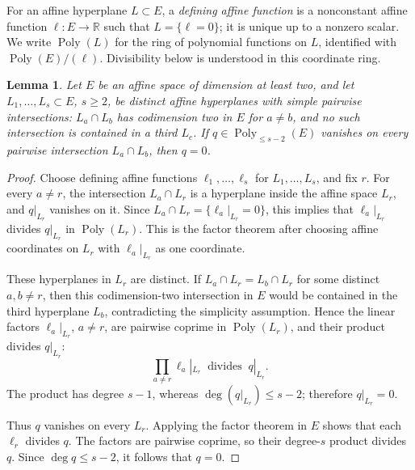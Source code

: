\documentclass[11pt,oneside]{article}
\newtheorem{lemma}[theorem]{Lemma}
\newcommand{\R}{\mathbb R}
\begin{document}
For an affine hyperplane \(L\subset E\), a \emph{defining affine function} is a
nonconstant affine function \(\ell:E\to\R\) such that \(L=\{\ell=0\}\); it is
unique up to a nonzero scalar.  We write \(\operatorname{Poly}(L)\) for the
ring of polynomial functions on \(L\), identified with
\(\operatorname{Poly}(E)/(\ell)\).  Divisibility below is understood in this
coordinate ring.

\begin{lemma}
\label{lem:hermite-arrangement}
Let \(E\) be an affine space of dimension at least two, and let
\(L_1,\ldots,L_s\subset E\), \(s\ge2\), be distinct affine hyperplanes with
simple pairwise intersections: \(L_a\cap L_b\) has codimension two in \(E\)
for \(a\ne b\), and no such intersection is contained in a third \(L_c\).
If \(q\in \operatorname{Poly}_{\le s-2}(E)\) vanishes on every pairwise
intersection \(L_a\cap L_b\), then \(q=0\).
\end{lemma}

\begin{proof}
Choose defining affine functions \(\ell_1,\ldots,\ell_s\) for
\(L_1,\ldots,L_s\), and fix \(r\).  For every \(a\ne r\), the intersection
\(L_a\cap L_r\) is a hyperplane inside the affine space \(L_r\), and
\(q|_{L_r}\) vanishes on it.  Since
\(L_a\cap L_r=\{\ell_a|_{L_r}=0\}\), this implies that
\(\ell_a|_{L_r}\) divides \(q|_{L_r}\) in \(\operatorname{Poly}(L_r)\).
This is the factor theorem after choosing affine coordinates on \(L_r\) with
\(\ell_a|_{L_r}\) as one coordinate.

These hyperplanes in \(L_r\) are distinct.  If
\(L_a\cap L_r=L_b\cap L_r\) for some distinct \(a,b\ne r\), then this
codimension-two intersection in \(E\) would be contained in the third
hyperplane \(L_b\), contradicting the simplicity assumption.  Hence the linear
factors \(\ell_a|_{L_r}\), \(a\ne r\), are pairwise coprime in
\(\operatorname{Poly}(L_r)\), and their product divides \(q|_{L_r}\):
\begin{equation}
  \prod_{a\ne r}\ell_a|_{L_r}\;\;\text{divides}\;\;q|_{L_r}.
\end{equation}
The product has degree \(s-1\), whereas \(\deg(q|_{L_r})\le s-2\); therefore
\(q|_{L_r}=0\).

Thus \(q\) vanishes on every \(L_r\).  Applying the factor theorem in \(E\)
shows that each \(\ell_r\) divides \(q\).  The factors are pairwise coprime, so
their degree-\(s\) product divides \(q\).  Since \(\deg q\le s-2\), it follows
that \(q=0\).
\end{proof}
\end{document}
